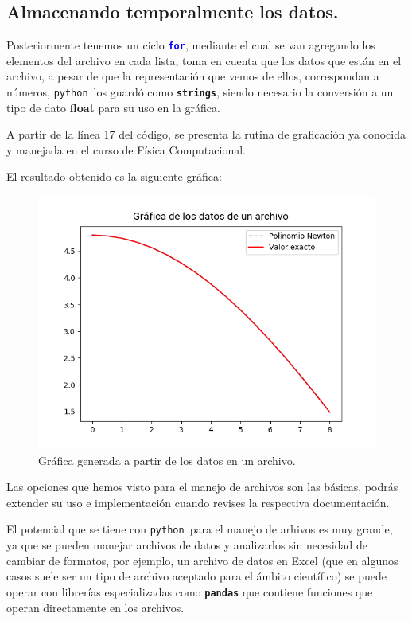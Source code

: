 \documentclass[12pt]{article}
\newcommand{\azulfuerte}[1]{\textcolor{blue}{\textbf{#1}}}
\newcommand{\python}{\texttt{python}}
\begin{document}
\subsection{Almacenando temporalmente los datos.}
Posteriormente tenemos un ciclo \azulfuerte{\texttt{for}}, mediante el cual se van agregando los elementos del archivo en cada lista, toma en cuenta que los datos que están en el archivo, a pesar de que la representación que vemos de ellos, correspondan a números, \python\ los guardó como \textbf{\texttt{strings}}, siendo necesario la conversión a un tipo de dato \textbf{float} para su uso en la gráfica.
\par
A partir de la línea 17 del código, se presenta la rutina de graficación ya conocida y manejada en el curso de Física Computacional.
\par
El resultado obtenido es la siguiente gráfica:
\begin{figure}[H]
\centering
\includegraphics[scale=0.9]{Imagenes/Archivos_01}
\caption{Gráfica generada a partir de los datos en un archivo.}
\end{figure}
Las opciones que hemos visto para el manejo de archivos son las básicas, podrás extender su uso e implementación cuando revises la respectiva documentación.
\par
El potencial que se tiene con \python\ para el manejo de arhivos es muy grande, ya que se pueden manejar archivos de datos y analizarlos sin necesidad de cambiar de formatos, por ejemplo, un archivo de datos en Excel (que en algunos casos suele ser un tipo de archivo aceptado para el ámbito científico) se puede operar con librerías especializadas como \texttt{\textbf{pandas}} que contiene funciones que operan directamente en los archivos.
\end{document}
